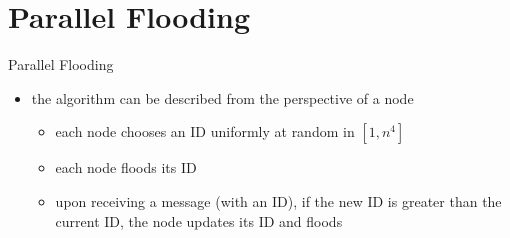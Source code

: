 \section{Parallel Flooding}
\begin{frame}{Parallel Flooding}
    \begin{itemize}
        \item the algorithm can be described from the perspective of a node
              \begin{itemize}
                  \item each node chooses an ID uniformly at random in $[1, n^4]$
                  \item each node floods its ID
                  \item upon receiving a message (with an ID), if the new ID is
                        greater than the current ID, the node updates its ID and
                        floods
              \end{itemize}
    \end{itemize}
\end{frame}


